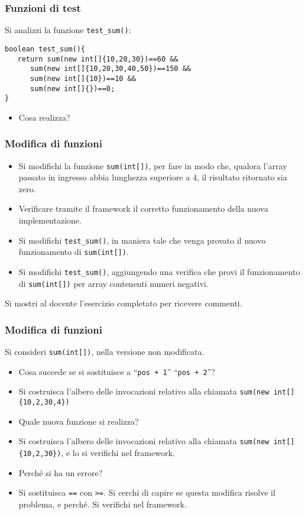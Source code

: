 \documentclass{beamer}
\begin{document}
\begin{frame}[fragile]
\frametitle{Funzioni di test}
Si analizzi la funzione \texttt{test\_sum()}:
\begin{verbatim}
boolean test_sum(){
   return sum(new int[]{10,20,30})==60 &&
      sum(new int[]{10,20,30,40,50})==150 &&
      sum(new int[]{10})==10 &&
      sum(new int[]{})==0;
}
\end{verbatim}
\begin{itemize}
 \item Cosa realizza?
\end{itemize}
\end{frame}

\begin{frame}[fragile]
\frametitle{Modifica di funzioni}
\begin{itemize}
 \item Si modifichi la funzione \texttt{sum(int[])}, per fare in modo che, qualora l'array passato in ingresso abbia lunghezza superiore a 4, il risultato ritornato sia zero.
 \item Verificare tramite il framework il corretto funzionamento della nuova implementazione.
 \item Si modifichi \texttt{test\_sum()}, in maniera tale che venga provato il nuovo funzionamento di \texttt{sum(int[])}.
 \item Si modifichi \texttt{test\_sum()}, aggiungendo una verifica che provi il funzionamento di \texttt{sum(int[])} per array contenenti numeri negativi.
\end{itemize}
Si mostri al docente l'esercizio completato per ricevere commenti.
\end{frame}

\begin{frame}[fragile]
\frametitle{Modifica di funzioni}
Si consideri \texttt{sum(int[])}, nella versione non modificata.
\begin{itemize}
 \item Cosa succede se si sostituisce a ``\texttt{pos + 1}'' ``\texttt{pos + 2}''?
 \item Si costruisca l'albero delle invocazioni relativo alla chiamata \texttt{sum(new int[]\{10,2,30,4\})}
 \item Quale nuova funzione si realizza?
 \item Si costruisca l'albero delle invocazioni relativo alla chiamata \texttt{sum(new int[]\{10,2,30\})}, e lo si verifichi nel framework.
 \item Perché si ha un errore?
 \item Si sostituisca \texttt{==} con \texttt{>=}. Si cerchi di capire se questa modifica risolve il problema, e perché. Si verifichi nel framework.
\end{itemize}
\end{frame}
\end{document}
